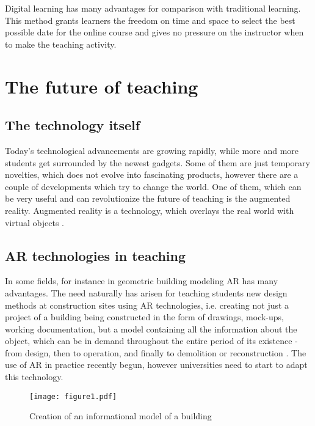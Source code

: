 \documentclass[10pt,twoside,english,a4paper]{article}
\begin{document}
	Digital learning has many advantages for comparison with traditional learning. This method grants learners the freedom on time and space to select the best possible date for the online course and gives no pressure on the instructor when to make the teaching activity.  \cite{Lin2017}

\section{The future of teaching}

\subsection{The technology itself}

	Today's technological advancements are growing rapidly, while more and more students get surrounded by the newest gadgets. Some of them are just temporary novelties, which does not evolve into fascinating products, however there are a couple of developments which try to change the world. One of them, which can be very useful and can revolutionize the future of teaching is the augmented reality. Augmented reality is a technology, which overlays the real world with virtual objects \cite{Tretyakova2019}.

\subsection{AR technologies in teaching}

	 In some fields, for instance in geometric building modeling AR has many advantages. The need naturally has arisen for teaching students new design methods at construction sites using AR technologies, i.e. creating not just a project of a building being constructed in the form of drawings, mock-ups, working documentation, but a model containing all the information about the object, which can be in demand throughout the entire period of its existence - from design, then to operation, and finally to demolition or reconstruction \cite{Tretyakova2019}. The use of AR in practice recently begun, however universities need to start to adapt this technology. 



\begin{figure*}[tbh]
\centering
\texttt{[image: figure1.pdf]}
\caption{Creation of an informational model of a building\cite{Tretyakova2019}}
\label{f:rozhod}
\end{figure*}
\end{document}
